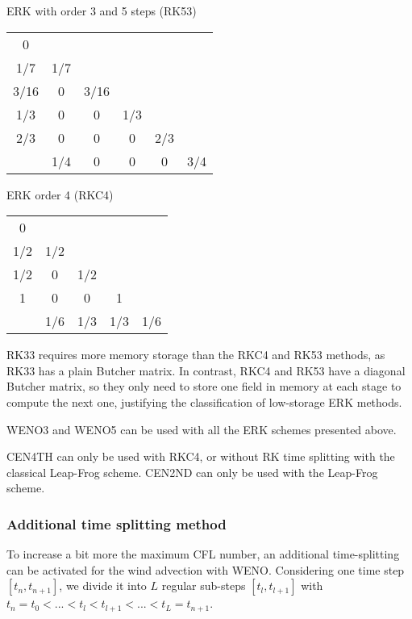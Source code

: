 \begin{multicols}{2}
\begin{center}
    ERK with order 3 and 5 steps (RK53) \\
    \begin{tabular}{c|ccccc}
        0    & & & & & \\
        1/7  & 1/7 & & & & \\
        3/16 &  0  & 3/16 &   & & \\
        1/3  &  0  &  0   & 1/3 & & \\
        2/3  &  0  &  0   & 0   & 2/3 & \\
        \hline
        & 1/4 & 0 & 0 & 0 & 3/4 \\		
    \end{tabular}
\end{center}

\begin{center}
    ERK order 4 (RKC4) \\
    \begin{tabular}{c|cccc}
        0   & & & & \\
        1/2 & 1/2 & & & \\
        1/2 &  0  & 1/2 &   & \\
        1   &  0  &  0  & 1 & \\
        \hline
        & 1/6 & 1/3 & 1/3 & 1/6 \\		
    \end{tabular}
\end{center}
\end{multicols}


RK33 requires more memory storage 
than the RKC4 and RK53 methods, as RK33 has a plain Butcher matrix. In contrast, RKC4 and RK53 have a diagonal Butcher matrix, so they only need to store 
one field in memory at each stage to compute the next one, justifying the classification of low-storage ERK methods.
 
\noindent WENO3 and WENO5 can be used with all the ERK schemes presented above.

\noindent CEN4TH can only be used with RKC4, or without RK time splitting with the classical Leap-Frog scheme. CEN2ND can only be used with the Leap-Frog scheme.

\subsubsection{Additional time splitting method}

To increase a bit more the maximum CFL number, an additional time-splitting can be activated for the wind advection with WENO. Considering one time step $[t_n,t_{n+1}]$, we divide it into $L$ regular sub-steps $[t_l,t_{l+1}]$ with $t_n=t_0 < ... < t_l < t_{l+1} < ... < t_L=t_{n+1}$. 

